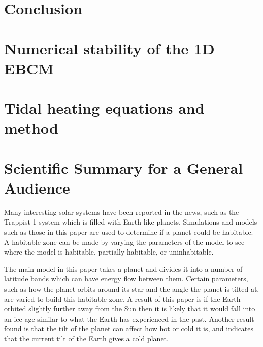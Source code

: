 \documentclass[12pt, onecolumn]{revtex4-2}    %
\begin{document}
\section{Conclusion} \label{sec:Conclusion}






\clearpage

\appendix

\section{Numerical stability of the 1D EBCM} \label{appx:NumStability}

\section{Tidal heating equations and method} \label{appx:TidalHeatingEquationsMethod}

\clearpage

\section*{Scientific Summary for a General Audience}

Many interesting solar systems have been reported in the news, such as the Trappist-1 system which is filled with Earth-like planets.
Simulations and models such as those in this paper are used to determine if a planet could be habitable.
A habitable zone can be made by varying the parameters of the model to see where the model is habitable, partially habitable, or uninhabitable.

The main model in this paper takes a planet and divides it into a number of latitude bands which can have energy flow between them.
Certain parameters, such as how the planet orbits around its star and the angle the planet is tilted at, are varied to build this habitable zone.
A result of this paper is if the Earth orbited slightly further away from the Sun then it is likely that it would fall into an ice age similar to what the Earth has experienced in the past.
Another result found is that the tilt of the planet can affect how hot or cold it is, and indicates that the current tilt of the Earth gives a cold planet.
\end{document}
